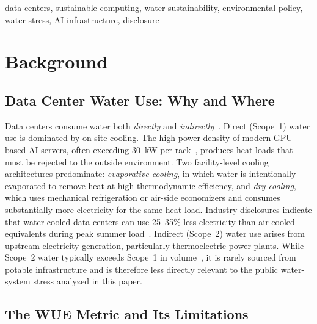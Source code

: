 \documentclass[conference,10pt]{IEEEtran}
\begin{document}
\begin{IEEEkeywords}
data centers, sustainable computing, water sustainability,
environmental policy, water stress, AI infrastructure, disclosure
\end{IEEEkeywords}



\section{Background}
\label{sec:background}

\subsection{Data Center Water Use: Why and Where}

Data centers consume water both \emph{directly} and
\emph{indirectly}~\cite{li2023thirsty, han2026}. Direct (Scope~1) water
use is dominated by on-site cooling. The high power density of modern
GPU-based AI servers, often exceeding 30~kW per rack~\cite{lbnl2024},
produces heat loads that must be rejected to the outside environment.
Two facility-level cooling architectures predominate: \emph{evaporative
cooling}, in which water is intentionally evaporated to remove heat at
high thermodynamic efficiency, and \emph{dry cooling}, which uses
mechanical refrigeration or air-side economizers and consumes
substantially more electricity for the same heat load. Industry
disclosures indicate that water-cooled data centers can use 25--35\%
less electricity than air-cooled equivalents during peak summer
load~\cite{han2026, google2025envreport}. Indirect (Scope~2) water use
arises from upstream electricity generation, particularly thermoelectric
power plants. While Scope~2 water typically exceeds Scope~1 in
volume~\cite{li2023thirsty}, it is rarely sourced from potable
infrastructure and is therefore less directly relevant to the public
water-system stress analyzed in this paper.

\subsection{The WUE Metric and Its Limitations}
\end{document}
